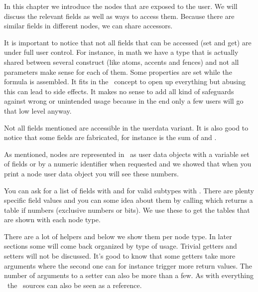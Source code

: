 In this chapter we introduce the nodes that are exposed to the user. We will
discuss the relevant fields as well as ways to access them. Because there are
similar fields in different nodes, we can share accessors.

It is important to notice that not all fields that can be accessed (set and get)
are under full user control. For instance, in math we have a  type
that is actually shared between several construct (like atoms, accents and
fences) and not all parameters make sense for each of them. Some properties are
set while the formula is assembled. It fits in the \LUAMETATEX\ concept to open
up everything but abusing this can lead to side effects. It makes no sense to add
all kind of safeguards against wrong or unintended usage because in the end only
a few users will go that low level anyway.

Not all fields mentioned are accessible in the userdata variant. It is also good
to notice that some fields are fabricated, for instance  is the sum
of  and .

\stopsection

\startsection[title={\LUA\ node representation}]

As mentioned, nodes are represented in \LUA\ as user data objects with a variable
set of fields or by a numeric identifier when requested and we showed that when
you print a node user data object you will see these numbers.

\startcolumns[n=4]
\stopcolumns

You can ask for a list of fields with  and for valid subtypes
with . There are plenty specific field values and you can
some idea about them by calling  which returns a table if
numbers (exclusive numbers or bits). We use these to get the tables that are
shown with each node type.

There are a lot of helpers and below we show them per node type. In later
sections some will come back organized by type of usage. Trivial getters and
setters will not be discussed. It's good to know that some getters take more
arguments where the second one can for instance trigger more return values. The
number of arguments to a setter can also be more than a few. As with everything
\LUAMETATEX\ the \CONTEXT\ sources can also be seen as  a reference.

\stopsection

\startsection[title={Main text nodes}]

